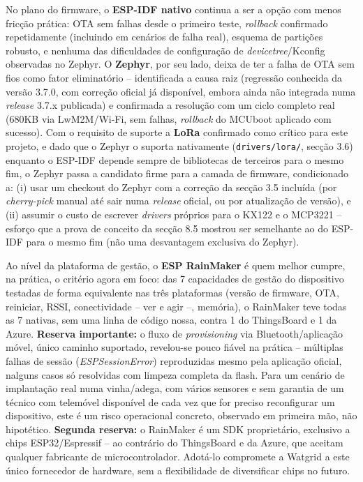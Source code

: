 \documentclass[a4paper,12pt]{article}
\begin{document}
No plano do firmware, o \textbf{ESP-IDF nativo} continua a ser a opção com menos fricção prática: OTA sem falhas desde o primeiro teste, \textit{rollback} confirmado repetidamente (incluindo em cenários de falha real), esquema de partições robusto, e nenhuma das dificuldades de configuração de \textit{devicetree}/Kconfig observadas no Zephyr. O \textbf{Zephyr}, por seu lado, deixa de ter a falha de OTA sem fios como fator eliminatório -- identificada a causa raiz (regressão conhecida da versão 3.7.0, com correção oficial já disponível, embora ainda não integrada numa \textit{release} 3.7.x publicada) e confirmada a resolução com um ciclo completo real (680KB via LwM2M/Wi-Fi, sem falhas, \textit{rollback} do MCUboot aplicado com sucesso). Com o requisito de suporte a \textbf{LoRa} confirmado como crítico para este projeto, e dado que o Zephyr o suporta nativamente (\texttt{drivers/lora/}, secção 3.6) enquanto o ESP-IDF depende sempre de bibliotecas de terceiros para o mesmo fim, o Zephyr passa a candidato firme para a camada de firmware, condicionado a: (i) usar um checkout do Zephyr com a correção da secção 3.5 incluída (por \textit{cherry-pick} manual até sair numa \textit{release} oficial, ou por atualização de versão), e (ii) assumir o custo de escrever \textit{drivers} próprios para o KX122 e o MCP3221 -- esforço que a prova de conceito da secção 8.5 mostrou ser semelhante ao do ESP-IDF para o mesmo fim (não uma desvantagem exclusiva do Zephyr).

Ao nível da plataforma de gestão, o \textbf{ESP RainMaker} é quem melhor cumpre, na prática, o critério agora em foco: das 7 capacidades de gestão do dispositivo testadas de forma equivalente nas três plataformas (versão de firmware, OTA, reiniciar, RSSI, conectividade -- ver e agir --, memória), o RainMaker teve todas as 7 nativas, sem uma linha de código nossa, contra 1 do ThingsBoard e 1 da Azure. \textbf{Reserva importante:} o fluxo de \textit{provisioning} via Bluetooth/aplicação móvel, único caminho suportado, revelou-se pouco fiável na prática -- múltiplas falhas de sessão (\textit{ESPSessionError}) reproduzidas mesmo pela aplicação oficial, nalguns casos só resolvidas com limpeza completa da flash. Para um cenário de implantação real numa vinha/adega, com vários sensores e sem garantia de um técnico com telemóvel disponível de cada vez que for preciso reconfigurar um dispositivo, este é um risco operacional concreto, observado em primeira mão, não hipotético. \textbf{Segunda reserva:} o RainMaker é um SDK proprietário, exclusivo a chips ESP32/Espressif -- ao contrário do ThingsBoard e da Azure, que aceitam qualquer fabricante de microcontrolador. Adotá-lo compromete a Watgrid a este único fornecedor de hardware, sem a flexibilidade de diversificar chips no futuro.
\end{document}
